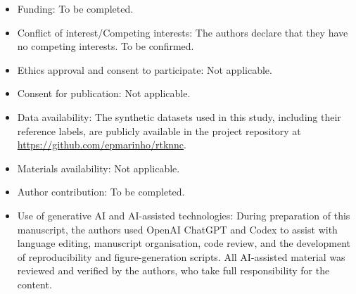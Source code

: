 \documentclass[pdflatex,sn-mathphys-num]{sn-jnl}
\begin{document}
\begin{itemize}
\item Funding: To be completed.
\item Conflict of interest/Competing interests: The authors declare that they have no competing interests. To be confirmed.
\item Ethics approval and consent to participate: Not applicable.
\item Consent for publication: Not applicable.
\item Data availability: The synthetic datasets used in this study, including their reference labels, are publicly available in the project repository at \url{https://github.com/epmarinho/rtknnc}.
\item Materials availability: Not applicable.
\item Author contribution: To be completed.
\item Use of generative AI and AI-assisted technologies: During preparation of
this manuscript, the authors used OpenAI ChatGPT and Codex to assist with
language editing, manuscript organisation, code review, and the development of
reproducibility and figure-generation scripts. All AI-assisted material was
reviewed and verified by the authors, who take full responsibility for the
content.
\end{itemize}


\end{document}
